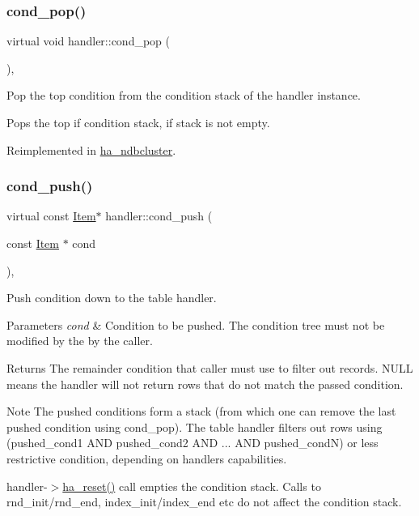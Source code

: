 \subsubsection{\texorpdfstring{cond\+\_\+pop()}{cond\_pop()}}
{\footnotesize\ttfamily virtual void handler\+::cond\+\_\+pop (\begin{DoxyParamCaption}{ }\end{DoxyParamCaption})\hspace{0.3cm}{\ttfamily [inline]}, {\ttfamily [virtual]}}

Pop the top condition from the condition stack of the handler instance.

Pops the top if condition stack, if stack is not empty. 

Reimplemented in \mbox{\hyperlink{classha__ndbcluster_a0de805435e8251f27ba3394052f6b1c7}{ha\+\_\+ndbcluster}}.

\mbox{\label{classhandler_a5e765264bd31e0519e03e1bd53d8c6d2}} 
\subsubsection{\texorpdfstring{cond\+\_\+push()}{cond\_push()}}
{\footnotesize\ttfamily virtual const \mbox{\hyperlink{classItem}{Item}}$\ast$ handler\+::cond\+\_\+push (\begin{DoxyParamCaption}\item[{const \mbox{\hyperlink{classItem}{Item}} $\ast$}]{cond }\end{DoxyParamCaption})\hspace{0.3cm}{\ttfamily [inline]}, {\ttfamily [virtual]}}

Push condition down to the table handler.


\begin{DoxyParams}{Parameters}
{\em cond} & Condition to be pushed. The condition tree must not be modified by the by the caller.\\
\hline
\end{DoxyParams}
\begin{DoxyReturn}{Returns}
The \textquotesingle{}remainder\textquotesingle{} condition that caller must use to filter out records. N\+U\+LL means the handler will not return rows that do not match the passed condition.
\end{DoxyReturn}
\begin{DoxyNote}{Note}
The pushed conditions form a stack (from which one can remove the last pushed condition using cond\+\_\+pop). The table handler filters out rows using (pushed\+\_\+cond1 A\+ND pushed\+\_\+cond2 A\+ND ... A\+ND pushed\+\_\+condN) or less restrictive condition, depending on handler\textquotesingle{}s capabilities.
\end{DoxyNote}
handler-\/$>$\mbox{\hyperlink{classhandler_a53d38f167906d8aaa9e560c71e595a42}{ha\+\_\+reset()}} call empties the condition stack. Calls to rnd\+\_\+init/rnd\+\_\+end, index\+\_\+init/index\+\_\+end etc do not affect the condition stack. 

